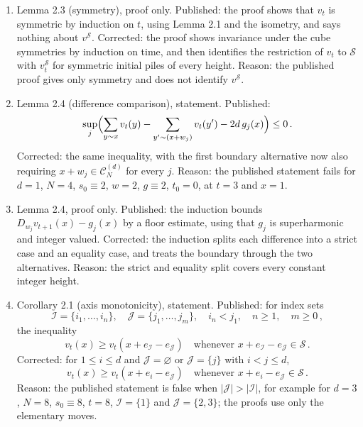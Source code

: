 \documentclass[12pt]{amsart}
\begin{document}
\begin{enumerate}
\item[C05.] Lemma 2.3 (symmetry), proof only. Published: the proof shows that $v_t$ is symmetric by induction on $t$, using Lemma 2.1 and the isometry, and says nothing about $v^{\mathcal S}$. Corrected: the proof shows invariance under the cube symmetries by induction on time, and then identifies the restriction of $v_t$ to $\mathcal S$ with $v_t^{\mathcal S}$ for symmetric initial piles of every height. Reason: the published proof gives only symmetry and does not identify $v^{\mathcal S}$.
\item[C06.] Lemma 2.4 (difference comparison), statement. Published:
\begin{equation*}
\sup_{j} \Bigl( \sum_{y \sim x} v_{t}(y) - \sum_{y' \sim (x + w_j)} v_{t}(y') - 2 d\, g_j(x) \Bigr) \leq 0\,.
\end{equation*}
Corrected: the same inequality, with the first boundary alternative now also requiring $x + w_j \in \mathcal{C}_N^{(d)}$ for every $j$. Reason: the published statement fails for $d=1$, $N=4$, $s_0 \equiv 2$, $w=2$, $g \equiv 2$, $t_0=0$, at $t=3$ and $x=1$.
\item[C07.] Lemma 2.4, proof only. Published: the induction bounds $D_{w_j} v_{t+1}(x) - g_j(x)$ by a floor estimate, using that $g_j$ is superharmonic and integer valued. Corrected: the induction splits each difference into a strict case and an equality case, and treats the boundary through the two alternatives. Reason: the strict and equality split covers every constant integer height.
\item[C08.] Corollary 2.1 (axis monotonicity), statement. Published: for index sets
\begin{equation*}
\mathcal I = \{i_1, \ldots, i_n\}, \quad \mathcal J = \{j_1, \ldots, j_m\}, \quad i_n < j_1, \quad n \geq 1, \quad m \geq 0\,,
\end{equation*}
the inequality
\begin{equation*}
v_t(x) \geq v_t(x + e_{\mathcal I} - e_{\mathcal J}) \quad \text{whenever } x + e_{\mathcal I} - e_{\mathcal J} \in \mathcal S\,.
\end{equation*}
Corrected: for $1 \leq i \leq d$ and $\mathcal J = \varnothing$ or $\mathcal J = \{j\}$ with $i < j \leq d$,
\begin{equation*}
v_t(x) \geq v_t(x + e_i - e_{\mathcal J}) \quad \text{whenever } x + e_i - e_{\mathcal J} \in \mathcal S\,.
\end{equation*}
Reason: the published statement is false when $\lvert \mathcal J \rvert > \lvert \mathcal I \rvert$, for example for $d=3$, $N=8$, $s_0 \equiv 8$, $t=8$, $\mathcal I = \{1\}$ and $\mathcal J = \{2,3\}$; the proofs use only the elementary moves.

\end{enumerate}
\end{document}
